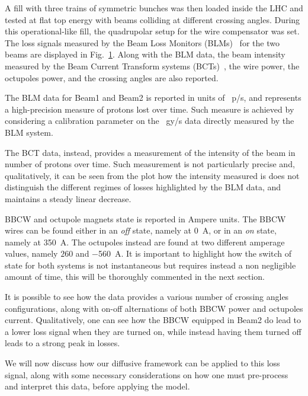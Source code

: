 A fill with three trains of symmetric bunches was then loaded inside the LHC and tested at flat top energy with beams colliding at different crossing angles. During this operational-like fill, the quadrupolar setup for the wire compensator was set. The loss signals measured by the Beam Loss Monitors (BLMs)~\cite{} for the two beams are displayed in Fig.~\ref{fig:wire-data}. Along with the BLM data, the beam intensity measured by the Beam Current Transform systems (BCTs)~\cite{}, the wire power, the octupoles power, and the crossing angles are also reported. 

\begin{figure}
    \centering
    \caption{}
    \label{fig:wire-data}
\end{figure}

The BLM data for Beam1 and Beam2 is reported in units of \SI{}{p/s}, and represents a high-precision measure of protons lost over time. Such measure is achieved by considering a calibration parameter on the \SI{}{gy/s} data directly measured by the BLM system.

The BCT data, instead, provides a measurement of the intensity of the beam in number of protons over time. Such measurement is not particularly precise and, qualitatively, it can be seen from the plot how the intensity measured is does not distinguish the different regimes of losses highlighted by the BLM data, and maintains a steady linear decrease.

BBCW and octupole magnets state is reported in Ampere units. The BBCW wires can be found either in an \textit{off} state, namely at \SI{0}{\ampere}, or in an \textit{on} state, namely at \SI{350}{\ampere}. The octupoles instead are found at two different amperage values, namely $260$ and \SI{-560}{\ampere}. It is important to highlight how the switch of state for both systems is not instantaneous but requires instead a non negligible amount of time, this will be thoroughly commented in the next section.

It is possible to see how the data provides a various number of crossing angles configurations, along with on-off alternations of both BBCW power and octupoles current. Qualitatively, one can see how the BBCW equipped in Beam2 do lead to a lower loss signal when they are turned on, while instead having them turned off leads to a strong peak in losses.

We will now discuss how our diffusive framework can be applied to this loss signal, along with some necessary considerations on how one must pre-process and interpret this data, before applying the model. 

